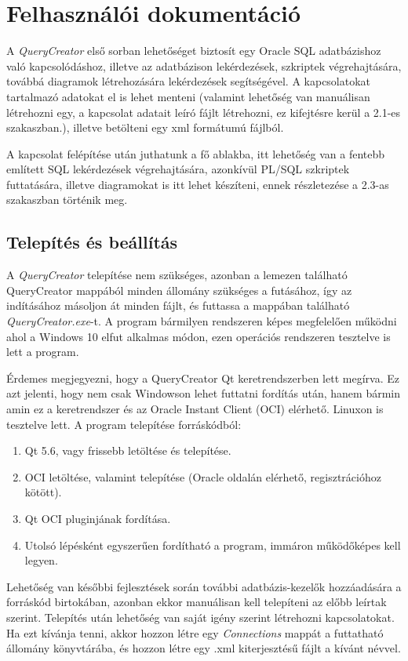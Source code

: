 \chapter{Felhasználói dokumentáció}
A \textit{QueryCreator} első sorban lehetőséget biztosít egy Oracle SQL adatbázishoz való kapcsolódáshoz, illetve
az adatbázison lekérdezések, szkriptek végrehajtására, továbbá diagramok létrehozására lekérdezések segítségével.
A kapcsolatokat tartalmazó adatokat el is lehet menteni (valamint lehetőség van manuálisan létrehozni egy, a kapcsolat adatait leíró fájlt létrehozni,
ez kifejtésre kerül a 2.1-es szakaszban.), illetve betölteni egy xml formátumú fájlból.

A kapcsolat felépítése után juthatunk a fő ablakba, itt lehetőség van a fentebb említett SQL lekérdezések végrehajtására, 
azonkívül PL/SQL szkriptek futtatására,
illetve diagramokat is itt lehet készíteni, ennek részletezése a 2.3-as szakaszban történik meg.

\section{Telepítés és beállítás}
A \textit{QueryCreator} telepítése nem szükséges, azonban a lemezen található QueryCreator mappából minden állomány szükséges a futásához,
így az indításához másoljon át minden fájlt, és futtassa a mappában található \textit{QueryCreator.exe}-t.
A program bármilyen rendszeren képes megfelelően működni ahol a
Windows 10 elfut alkalmas módon, ezen operációs rendszeren tesztelve is lett a program.

Érdemes megjegyezni, hogy a QueryCreator Qt keretrendszerben lett megírva. Ez azt jelenti, hogy nem csak Windowson lehet
futtatni fordítás után, hanem bármin amin ez a keretrendszer és az Oracle Instant Client (OCI) elérhető. Linuxon is tesztelve lett. A program telepítése
forráskódból:
\begin{enumerate}
  \item Qt 5.6, vagy frissebb letöltése és telepítése.
  \item OCI letöltése, valamint telepítése (Oracle oldalán elérhető, regisztrációhoz kötött).
  \item Qt OCI pluginjának fordítása.
  \item Utolsó lépésként egyszerűen fordítható a program, immáron működőképes kell legyen.
\end{enumerate}

Lehetőség van későbbi fejlesztések során további adatbázis-kezelők hozzáadására a forráskód birtokában, azonban ekkor
manuálisan kell telepíteni az előbb leírtak szerint.
Telepítés után lehetőség van saját igény szerint létrehozni kapcsolatokat. Ha ezt kívánja tenni, akkor hozzon létre egy
\textit{Connections} mappát a futtatható állomány könyvtárába, és hozzon létre egy .xml kiterjesztésű fájlt a kívánt névvel.

